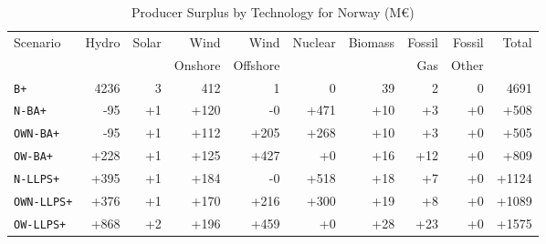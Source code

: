 \begin{table}[htbp]
\centering
\caption{Producer Surplus by Technology for Norway (M€)}
\label{tab:producer_surplus_technology}
\begin{tabular}{lrrrrrrrrr}
\toprule
Scenario & Hydro & Solar & Wind & Wind & Nuclear & Biomass & Fossil & Fossil & Total \\
         &       &       & Onshore & Offshore &  &  & Gas & Other &  \\
\midrule
\texttt{B+} & 4236 & 3 & 412 & 1 & 0 & 39 & 2 & 0 & 4691 \\
\midrule
\texttt{N-BA+} & -95 & +1 & +120 & -0 & +471 & +10 & +3 & +0 & +508 \\
\texttt{OWN-BA+} & -95 & +1 & +112 & +205 & +268 & +10 & +3 & +0 & +505 \\
\texttt{OW-BA+} & +228 & +1 & +125 & +427 & +0 & +16 & +12 & +0 & +809 \\
\midrule
\texttt{N-LLPS+} & +395 & +1 & +184 & -0 & +518 & +18 & +7 & +0 & +1124 \\
\texttt{OWN-LLPS+} & +376 & +1 & +170 & +216 & +300 & +19 & +8 & +0 & +1089 \\
\texttt{OW-LLPS+} & +868 & +2 & +196 & +459 & +0 & +28 & +23 & +0 & +1575 \\
\bottomrule
\end{tabular}
\end{table}
